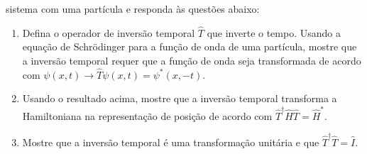 \begin{enumerate}
	      sistema com uma partícula e responda às questões abaixo:
	      \begin{enumerate}
		      \item Defina o operador de inversão temporal $\hat{T}$ que inverte o tempo.
		            Usando a equação de Schrödinger para a função de onda de uma partícula,
		            mostre que a inversão temporal requer que a
		            função de onda seja transformada de acordo com
		            $\psi(x,t)\rightarrow\hat{T}\psi(x,t)=\psi^*(x,-t)$.
		      \item Usando o resultado acima, mostre que a inversão temporal transforma
		            a Hamiltoniana na representação de posição de acordo com
		            $\hat{T}^\dagger\hat{H}\hat{T} = \hat{H}^*$.
		      \item Mostre que a inversão temporal é uma transformação unitária e que
		            $\hat{T}^\dagger\hat{T} = \hat{I}$.
	      \end{enumerate}

\end{enumerate}


